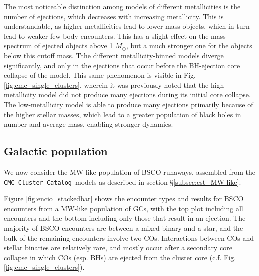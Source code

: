 \documentclass[twocolumn]{aastex631}
\newcommand{\CMCcat}{\texttt{CMC Cluster Catalog}}
\begin{document}
The most noticeable distinction among models of different metallicities is the number of ejections, which decreases with increasing metallicity.
This is understandable, as higher metallicities lead to lower-mass objects, which in turn lead to weaker few-body encounters.
This has a slight effect on the mass spectrum of ejected objects above 1 $M_\odot$, but a much stronger one for the objects below this cutoff mass.
Tthe different metallicity-binned models diverge significantly, and only in the ejections that occur before the BH-ejection core collapse of the model.
This same phenomenon is visible in Fig. \ref{fig:cmc_single_clusters}, wherein it was previously noted that the high-metallicity model did not produce many ejections during its initial core collapse.
The low-metallicity model is able to produce many ejections primarily because of the higher stellar masses, which lead to a greater population of black holes in number and average mass, enabling stronger dynamics.

\subsection{Galactic population} \label{subsec:res_MW-like}

We now consider the MW-like population of BSCO runaways, assembled from the \CMCcat\ models as described in section \S\ref{subsec:est_MW-like}.

Figure \ref{fig:encio_stackedbar} shows the encounter types and results for BSCO encounters from a MW-like population of GCs, with the top plot including all encounters and the bottom including only those that result in an ejection.
The majority of BSCO encounters are between a mixed binary and a star, and the bulk of the remaining encounters involve two COs.
Interactions between COs and stellar binaries are relatively rare, and mostly occur after a secondary core collapse in which COs (esp. BHs) are ejected from the cluster core (c.f. Fig. \ref{fig:cmc_single_clusters}).

\end{document}
